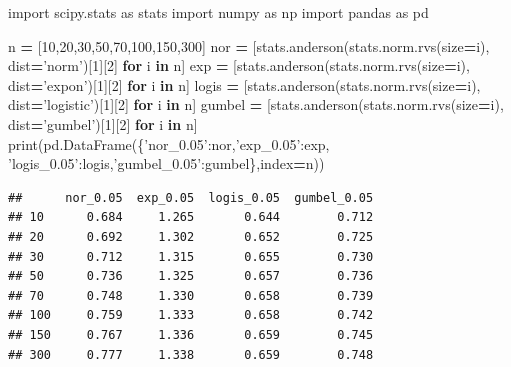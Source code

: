 \documentclass[polish,]{book}
\newenvironment{Shaded}{\begin{snugshade}}{\end{snugshade}}
\newcommand{\BuiltInTok}[1]{#1}
\newcommand{\ControlFlowTok}[1]{\textcolor[rgb]{0.13,0.29,0.53}{\textbf{#1}}}
\newcommand{\DecValTok}[1]{\textcolor[rgb]{0.00,0.00,0.81}{#1}}
\newcommand{\ImportTok}[1]{#1}
\newcommand{\KeywordTok}[1]{\textcolor[rgb]{0.13,0.29,0.53}{\textbf{#1}}}
\newcommand{\NormalTok}[1]{#1}
\newcommand{\OperatorTok}[1]{\textcolor[rgb]{0.81,0.36,0.00}{\textbf{#1}}}
\newcommand{\StringTok}[1]{\textcolor[rgb]{0.31,0.60,0.02}{#1}}
\begin{document}
\begin{Shaded}
\begin{Highlighting}[]
\ImportTok{import}\NormalTok{ scipy.stats }\ImportTok{as}\NormalTok{ stats}
\ImportTok{import}\NormalTok{ numpy }\ImportTok{as}\NormalTok{ np}
\ImportTok{import}\NormalTok{ pandas }\ImportTok{as}\NormalTok{ pd}
  
\NormalTok{n }\OperatorTok{=}\NormalTok{ [}\DecValTok{10}\NormalTok{,}\DecValTok{20}\NormalTok{,}\DecValTok{30}\NormalTok{,}\DecValTok{50}\NormalTok{,}\DecValTok{70}\NormalTok{,}\DecValTok{100}\NormalTok{,}\DecValTok{150}\NormalTok{,}\DecValTok{300}\NormalTok{]}
\NormalTok{nor }\OperatorTok{=}\NormalTok{ [stats.anderson(stats.norm.rvs(size}\OperatorTok{=}\NormalTok{i), dist}\OperatorTok{=}\StringTok{'norm'}\NormalTok{)[}\DecValTok{1}\NormalTok{][}\DecValTok{2}\NormalTok{] }\ControlFlowTok{for}\NormalTok{ i }\KeywordTok{in}\NormalTok{ n]}
\NormalTok{exp }\OperatorTok{=}\NormalTok{ [stats.anderson(stats.norm.rvs(size}\OperatorTok{=}\NormalTok{i), dist}\OperatorTok{=}\StringTok{'expon'}\NormalTok{)[}\DecValTok{1}\NormalTok{][}\DecValTok{2}\NormalTok{] }\ControlFlowTok{for}\NormalTok{ i }\KeywordTok{in}\NormalTok{ n]}
\NormalTok{logis }\OperatorTok{=}\NormalTok{ [stats.anderson(stats.norm.rvs(size}\OperatorTok{=}\NormalTok{i), dist}\OperatorTok{=}\StringTok{'logistic'}\NormalTok{)[}\DecValTok{1}\NormalTok{][}\DecValTok{2}\NormalTok{] }\ControlFlowTok{for}\NormalTok{ i }\KeywordTok{in}\NormalTok{ n]}
\NormalTok{gumbel }\OperatorTok{=}\NormalTok{ [stats.anderson(stats.norm.rvs(size}\OperatorTok{=}\NormalTok{i), dist}\OperatorTok{=}\StringTok{'gumbel'}\NormalTok{)[}\DecValTok{1}\NormalTok{][}\DecValTok{2}\NormalTok{] }\ControlFlowTok{for}\NormalTok{ i }\KeywordTok{in}\NormalTok{ n]}
\BuiltInTok{print}\NormalTok{(pd.DataFrame(\{}\StringTok{'nor_0.05'}\NormalTok{:nor,}\StringTok{'exp_0.05'}\NormalTok{:exp,}
                    \StringTok{'logis_0.05'}\NormalTok{:logis,}\StringTok{'gumbel_0.05'}\NormalTok{:gumbel\},index}\OperatorTok{=}\NormalTok{n))}
\end{Highlighting}
\end{Shaded}

\begin{verbatim}
##      nor_0.05  exp_0.05  logis_0.05  gumbel_0.05
## 10      0.684     1.265       0.644        0.712
## 20      0.692     1.302       0.652        0.725
## 30      0.712     1.315       0.655        0.730
## 50      0.736     1.325       0.657        0.736
## 70      0.748     1.330       0.658        0.739
## 100     0.759     1.333       0.658        0.742
## 150     0.767     1.336       0.659        0.745
## 300     0.777     1.338       0.659        0.748
\end{verbatim}
\end{document}
